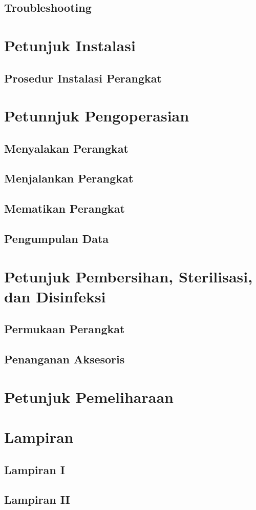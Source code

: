 \documentclass[11pt,a4paper,twoside,draft,onecolumn]{book}
\begin{document}
		\section{Troubleshooting}
	\newpage
	
	\chapter{Petunjuk Instalasi}
		\section{Prosedur Instalasi Perangkat}
	\newpage
	
	\chapter{Petunnjuk Pengoperasian}
		\section{Menyalakan Perangkat}
		\section{Menjalankan Perangkat}
		\section{Mematikan Perangkat}
		\section{Pengumpulan Data}
	\newpage
	
	\chapter{Petunjuk Pembersihan, Sterilisasi, dan Disinfeksi}
		\section{Permukaan Perangkat}
		\section{Penanganan Aksesoris}
	\newpage
	
	\chapter{Petunjuk Pemeliharaan}
	\newpage
	
	\chapter{Lampiran}
		\section{Lampiran I}
		\section{Lampiran II}
	\newpage
	
	
	
\end{document}
